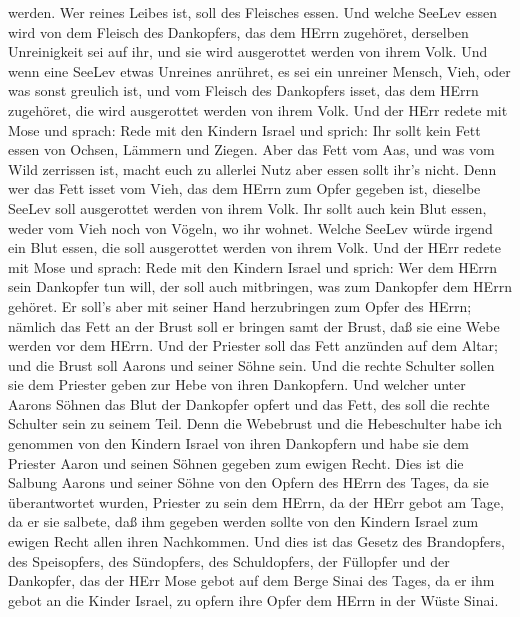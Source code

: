 werden. Wer reines Leibes ist, soll des Fleisches essen. 
Und welche SeeLev essen wird von dem Fleisch des Dankopfers, das dem
HErrn zugehöret, derselben Unreinigkeit sei auf ihr, und sie wird
ausgerottet werden von ihrem Volk.  Und wenn eine SeeLev
etwas Unreines anrühret, es sei ein unreiner Mensch, Vieh, oder was
sonst greulich ist, und vom Fleisch des Dankopfers isset, das dem HErrn
zugehöret, die wird ausgerottet werden von ihrem Volk.  Und
der HErr redete mit Mose und sprach:  Rede mit den Kindern
Israel und sprich: Ihr sollt kein Fett essen von Ochsen, Lämmern und
Ziegen.  Aber das Fett vom Aas, und was vom Wild zerrissen
ist, macht euch zu allerlei Nutz aber essen sollt ihr's nicht.
 Denn wer das Fett isset vom Vieh, das dem HErrn zum Opfer
gegeben ist, dieselbe SeeLev soll ausgerottet werden von ihrem Volk.
 Ihr sollt auch kein Blut essen, weder vom Vieh noch von
Vögeln, wo ihr wohnet.  Welche SeeLev würde irgend ein Blut
essen, die soll ausgerottet werden von ihrem Volk.  Und der
HErr redete mit Mose und sprach:  Rede mit den Kindern
Israel und sprich: Wer dem HErrn sein Dankopfer tun will, der soll auch
mitbringen, was zum Dankopfer dem HErrn gehöret.  Er soll's
aber mit seiner Hand herzubringen zum Opfer des HErrn; nämlich das Fett
an der Brust soll er bringen samt der Brust, daß sie eine Webe werden
vor dem HErrn.  Und der Priester soll das Fett anzünden auf
dem Altar; und die Brust soll Aarons und seiner Söhne sein.
 Und die rechte Schulter sollen sie dem Priester geben zur
Hebe von ihren Dankopfern.  Und welcher unter Aarons Söhnen
das Blut der Dankopfer opfert und das Fett, des soll die rechte Schulter
sein zu seinem Teil.  Denn die Webebrust und die
Hebeschulter habe ich genommen von den Kindern Israel von ihren
Dankopfern und habe sie dem Priester Aaron und seinen Söhnen gegeben zum
ewigen Recht.  Dies ist die Salbung Aarons und seiner Söhne
von den Opfern des HErrn des Tages, da sie überantwortet wurden,
Priester zu sein dem HErrn,  da der HErr gebot am Tage, da
er sie salbete, daß ihm gegeben werden sollte von den Kindern Israel zum
ewigen Recht allen ihren Nachkommen.  Und dies ist das
Gesetz des Brandopfers, des Speisopfers, des Sündopfers, des
Schuldopfers, der Füllopfer und der Dankopfer,  das der
HErr Mose gebot auf dem Berge Sinai des Tages, da er ihm gebot an die
Kinder Israel, zu opfern ihre Opfer dem HErrn in der Wüste Sinai.


